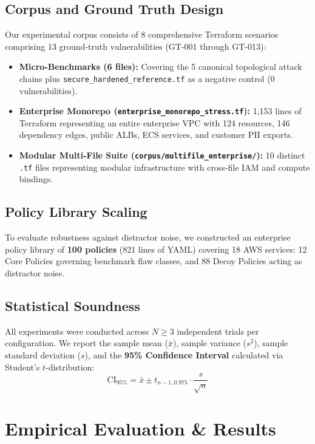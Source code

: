 \documentclass[conference]{IEEEtran}
\begin{document}
\subsection{Corpus and Ground Truth Design}
Our experimental corpus consists of 8 comprehensive Terraform scenarios comprising 13 ground-truth vulnerabilities (GT-001 through GT-013):
\begin{itemize}
    \item \textbf{Micro-Benchmarks (6 files):} Covering the 5 canonical topological attack chains plus \texttt{secure\_hardened\_reference.tf} as a negative control (0 vulnerabilities).
    \item \textbf{Enterprise Monorepo (\texttt{enterprise\_monorepo\_stress.tf}):} 1,153 lines of Terraform representing an entire enterprise VPC with 124 resources, 146 dependency edges, public ALBs, ECS services, and customer PII exports.
    \item \textbf{Modular Multi-File Suite (\texttt{corpus/multifile\_enterprise/}):} 10 distinct \texttt{.tf} files representing modular infrastructure with cross-file IAM and compute bindings.
\end{itemize}

\subsection{Policy Library Scaling}
To evaluate robustness against distractor noise, we constructed an enterprise policy library of \textbf{100 policies} (821 lines of YAML) covering 18 AWS services: 12 Core Policies governing benchmark flaw classes, and 88 Decoy Policies acting as distractor noise.

\subsection{Statistical Soundness}
All experiments were conducted across $N \ge 3$ independent trials per configuration. We report the sample mean ($\bar{x}$), sample variance ($s^2$), sample standard deviation ($s$), and the \textbf{95\% Confidence Interval} calculated via Student's $t$-distribution:
\begin{equation}
\text{CI}_{95\%} = \bar{x} \pm t_{n-1, 0.975} \cdot \frac{s}{\sqrt{n}}
\end{equation}

\section{Empirical Evaluation \& Results}
\end{document}
